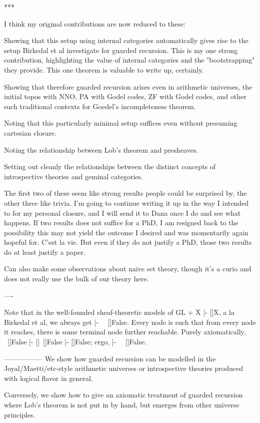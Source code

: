 ***

I think my original contributions are now reduced to these:

Showing that this setup using internal categories automatically gives rise to the setup Birkedal et al investigate for guarded recursion. This is my one strong contribution, highlighting the value of internal categories and the "bootstrapping" they provide. This one theorem is valuable to write up, certainly.

Showing that therefore guarded recursion arises even in arithmetic universes, the initial topos with NNO, PA with Godel codes, ZF with Godel codes, and other such traditional contexts for Goedel's incompleteness theorem.

Noting that this particularly minimal setup suffices even without presuming cartesian closure.

Noting the relationship between Lob's theorem and presheaves.

Setting out cleanly the relationships between the distinct concepts of introspective theories and geminal categories.

The first two of these seem like strong results people could be surprised by, the other three like trivia. I'm going to continue writing it up in the way I intended to for my personal closure, and I will send it to Dana once I do and see what happens. If two results does not suffice for a PhD, I am resigned back to the possibility this may not yield the outcome I desired and was momentarily again hopeful for. C'est la vie. But even if they do not justify a PhD, those two results do at least justify a paper.

Can also make some observations about naive set theory, though it's a curio and does not really use the bulk of our theory here.

----

Note that in the well-founded sheaf-theoretic models of GL + X |- []X, a la Birkedal et al, we always get |- ~~[]False. Every node is such that from every node it reaches, there is some terminal node further reachable. Purely axiomatically, ~[]False |- []~[]False |- []False; ergo, |- ~~[]False.

-----------------
We show how guarded recursion can be modelled in the Joyal/Maetti/etc-style arithmetic universes or introspective theories produced with logical flavor in general.

Conversely, we show how to give an axiomatic treatment of guarded recursion where Lob's theorem is not put in by hand, but emerges from other universe principles.


